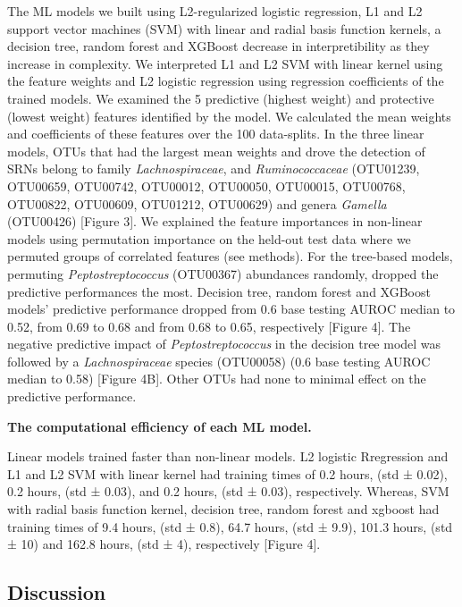 \documentclass[11pt,]{article}
\begin{document}
The ML models we built using L2-regularized logistic regression, L1 and
L2 support vector machines (SVM) with linear and radial basis function
kernels, a decision tree, random forest and XGBoost decrease in
interpretibility as they increase in complexity. We interpreted L1 and
L2 SVM with linear kernel using the feature weights and L2 logistic
regression using regression coefficients of the trained models. We
examined the 5 predictive (highest weight) and protective (lowest
weight) features identified by the model. We calculated the mean weights
and coefficients of these features over the 100 data-splits. In the
three linear models, OTUs that had the largest mean weights and drove
the detection of SRNs belong to family \emph{Lachnospiraceae}, and
\emph{Ruminococcaceae} (OTU01239, OTU00659, OTU00742, OTU00012,
OTU00050, OTU00015, OTU00768, OTU00822, OTU00609, OTU01212, OTU00629)
and genera \emph{Gamella} (OTU00426) {[}Figure 3{]}. We explained the
feature importances in non-linear models using permutation importance on
the held-out test data where we permuted groups of correlated features
(see methods). For the tree-based models, permuting
\emph{Peptostreptococcus} (OTU00367) abundances randomly, dropped the
predictive performances the most. Decision tree, random forest and
XGBoost models' predictive performance dropped from 0.6 base testing
AUROC median to 0.52, from 0.69 to 0.68 and from 0.68 to 0.65,
respectively {[}Figure 4{]}. The negative predictive impact of
\emph{Peptostreptococcus} in the decision tree model was followed by a
\emph{Lachnospiraceae} species (OTU00058) (0.6 base testing AUROC median
to 0.58) {[}Figure 4B{]}. Other OTUs had none to minimal effect on the
predictive performance.

\textbf{The computational efficiency of each ML model.}

Linear models trained faster than non-linear models. L2 logistic
Rregression and L1 and L2 SVM with linear kernel had training times of
0.2 hours, (std ± 0.02), 0.2 hours, (std ± 0.03), and 0.2 hours, (std ±
0.03), respectively. Whereas, SVM with radial basis function kernel,
decision tree, random forest and xgboost had training times of 9.4
hours, (std ± 0.8), 64.7 hours, (std ± 9.9), 101.3 hours, (std ± 10) and
162.8 hours, (std ± 4), respectively {[}Figure 4{]}.

\subsection{Discussion}\label{discussion}
\end{document}
